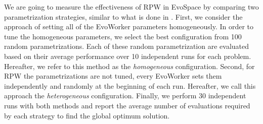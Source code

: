 \documentclass[conference]{IEEEtran}
\begin{document}
We are going to measure the effectiveness of RPW in EvoSpace by
comparing two parametrization strategies,
similar to what is done in \cite{fuku1,fuku2,LNCS86720702}. First, we consider the approach of setting all
of the EvoWorker parameters homogeneously. In order to tune the homogeneous parameters,
we select the best configuration from 100 random parametrizations.
Each of these random parametrization are evaluated based on their average performance over 10
independent runs for each problem.
Hereafter, we refer to this method as the {\em homogeneous} configuration.
Second, for RPW the parametrizations
are not tuned, every EvoWorker sets them independently and randomly at the beginning of each run.
Hereafter, we call this approach the {\em heterogeneous} configuration. Finally, we perform 30 independent runs
with both methods and report the average number of evaluations required by each strategy to find the
global optimum solution.
\end{document}
